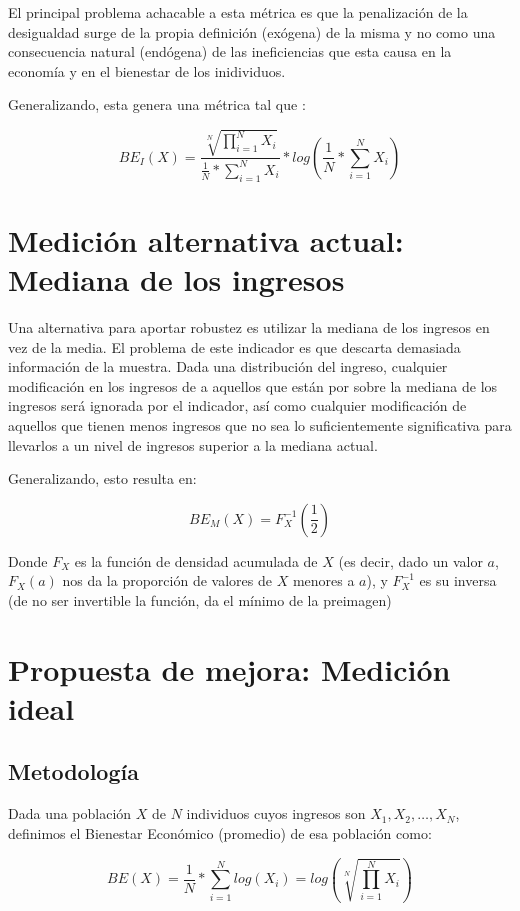 El principal problema achacable a esta métrica es que la penalización de la desigualdad surge de la propia definición (exógena) de la misma y no como una consecuencia natural (endógena) de las ineficiencias que esta causa en la economía y en el bienestar de los inidividuos.

Generalizando, esta genera una métrica tal que :

$$
    BE_I(X) = \frac{\sqrt[N]{\prod_{i=1}^NX_i}}{\frac{1}{N} * \sum_{i=1}^N X_i} * log(\frac{1}{N} * \sum_{i=1}^{N}X_i)
$$



\section{Medición alternativa actual: Mediana de los ingresos}

Una alternativa para aportar robustez es utilizar la mediana de los ingresos en vez de la media. El problema de este indicador es que descarta demasiada información de la muestra. Dada una distribución del ingreso, cualquier modificación en los ingresos de a aquellos que están por sobre la mediana de los ingresos será ignorada por el indicador, así como cualquier modificación de aquellos que tienen menos ingresos que no sea lo suficientemente significativa para llevarlos a un nivel de ingresos superior a la mediana actual.

Generalizando, esto resulta en:

$$
    BE_M(X) = F_X^{-1}(\frac{1}{2})
$$

Donde $F_X$ es la función de densidad acumulada de $X$ (es decir, dado un valor $a$, $F_X(a)$ nos da la proporción de valores de $X$ menores a $a$), y $F_X^{-1}$ es su inversa (de no ser invertible la función, da el mínimo de la preimagen)

\section{Propuesta de mejora: Medición ideal}

\subsection{Metodología}

Dada una población $X$ de $N$ individuos cuyos ingresos son $X_1, X_2, \dots, X_N$, definimos el Bienestar Económico (promedio) de esa población como:

$$
    BE(X) = \frac{1}{N} * \sum_{i=1}^N log(X_i) = log(\sqrt[N]{\prod_{i=1}^N X_i})
$$

